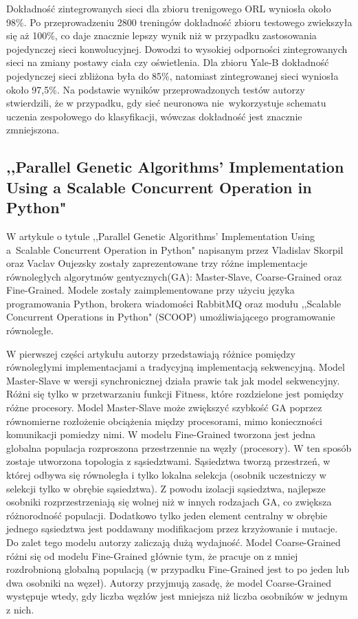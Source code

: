 \documentclass[12pt]{article}
\begin{document}
Dokładność zintegrowanych sieci dla zbioru trenigowego ORL wyniosła około 98\%. Po przeprowadzeniu 2800 treningów dokładność zbioru testowego zwiekszyła się aż 100\%, co daje
znacznie lepszy wynik niż w przypadku zastosowania pojedynczej sieci konwolucyjnej. Dowodzi to wysokiej odporności zintegrowanych sieci na zmiany postawy ciała czy oświetlenia.
Dla zbioru Yale-B dokładność pojedynczej sieci zbliżona była do 85\%, natomiast zintegrowanej sieci wyniosła około 97,5\%. Na podstawie wyników przeprowadzonych testów
autorzy stwierdzili, że w przypadku, gdy sieć neuronowa nie~wykorzystuje schematu uczenia zespołowego do klasyfikacji, wówczas dokładność jest znacznie zmniejszona.

\subsection{,,Parallel Genetic Algorithms' Implementation\\Using a Scalable Concurrent Operation in Python"}

W artykule o tytule ,,Parallel Genetic Algorithms' Implementation Using a~Scalable Concurrent Operation in Python" napisanym przez Vladislav Skorpil oraz Vaclav Oujezsky zostały
zaprezentowane trzy różne implementacje równoległych algorytmów gentycznych(GA): Master-Slave, Coarse-Grained oraz Fine-Grained. Modele zostały zaimplementowane przy użyciu
języka programowania Python, brokera wiadomości RabbitMQ oraz modułu ,,Scalable Concurrent Operations in Python" (SCOOP) umożliwiającego programowanie równoległe.

W pierwszej części artykułu autorzy przedstawiają różnice pomiędzy równoległymi implementacjami a tradycyjną implementacją sekwencyjną. Model Master-Slave w wersji synchronicznej
działa prawie tak jak model sekwencyjny. Różni się tylko w przetwarzaniu funkcji Fitness, które rozdzielone jest pomiędzy różne procesory. Model Master-Slave może
zwiększyć szybkość GA poprzez równomierne rozłożenie obciążenia między procesorami, mimo konieczności komunikacji pomiedzy nimi. W modelu Fine-Grained tworzona jest jedna
globalna populacja rozproszona przestrzennie na węzły (procesory). W ten sposób zostaje utworzona topologia z sąsiedztwami. Sąsiedztwa tworzą przestrzeń, w której odbywa się równoległa i
tylko lokalna selekcja (osobnik uczestniczy w selekcji tylko w obrębie sąsiedztwa). Z powodu izolacji sąsiedztwa, najlepsze osobniki rozprzestrzeniają się wolnej niż w innych rodzajach GA,
co zwiększa różnorodność populacji. Dodatkowo tylko jeden element centralny w obrębie jednego sąsiedztwa jest poddawany modifikacjom przez krzyżowanie i mutacje. Do zalet tego modelu
autorzy zaliczają dużą wydajność. Model Coarse-Grained różni się od modelu Fine-Grained głównie tym, że pracuje on z mniej rozdrobnioną globalną populacją (w przypadku Fine-Grained
jest to po jeden lub dwa osobniki na węzeł). Autorzy przyjmują zasadę, że model Coarse-Grained występuje wtedy, gdy liczba węzłów jest mniejsza niż liczba osobników w jednym z nich.
\end{document}

